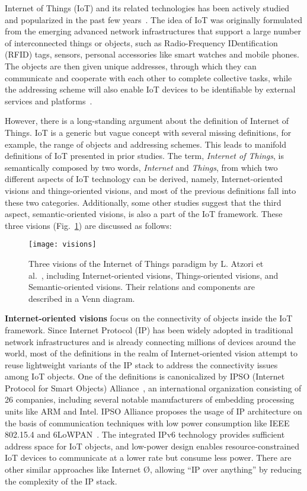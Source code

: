  Internet of Things (IoT) and its related technologies has been actively studied and popularized in the past few years~\cite{DBLP:journals/jnca/AlabaOHA17}. The idea of IoT was originally formulated from the emerging advanced network infrastructures that support a large number of interconnected things or objects, such as Radio-Frequency IDentification (RFID) tags, sensors, personal accessories like smart watches and mobile phones. The objects are then given unique addresses, through which they can communicate and cooperate with each other to complete collective tasks, while the addressing scheme will also enable IoT devices to be identifiable by external services and platforms~\cite{giusto2010internet}\cite{tan2010future}.

However, there is a long-standing argument about the definition of  Internet of Things. IoT is a generic but vague concept with several missing definitions, for example, the range of objects and addressing schemes. This leads to manifold definitions of IoT presented in prior studies. The term, \textit{Internet of Things}, is semantically composed by two words, \textit{Internet} and \textit{Things}, from which two different aspects of IoT technology can be derived, namely, Internet-oriented visions and things-oriented visions, and most of the previous definitions fall into these two categories. Additionally, some other studies suggest that the third aspect, semantic-oriented visions, is also a part of the IoT framework. These three visions (Fig.~\ref{fig:visions}) are discussed as follows:

\begin{figure}[htbp]
	\centering
  	\texttt{[image: visions]}
  	\caption{Three visions of the Internet of Things paradigm by L. Atzori et al.~\cite{DBLP:journals/jnca/AlabaOHA17}, including Internet-oriented visions, Things-oriented visions, and Semantic-oriented visions. Their relations and components are  described in a Venn diagram.}
  	\label{fig:visions}
\end{figure}

\textbf{Internet-oriented visions} focus on the connectivity of objects inside the IoT framework. Since Internet Protocol (IP) has been widely adopted in traditional network infrastructures and is already connecting millions of devices around the world, most of the definitions in the realm of Internet-oriented vision attempt to reuse lightweight variants of the IP stack to address the connectivity issues among IoT objects. One of the definitions is canonicalized by IPSO (Internet Protocol for Smart Objects) Alliance~\cite{vasseur2008ip}, an international organization consisting of 26 companies, including several notable manufacturers of embedding processing units like ARM and Intel. IPSO Alliance proposes the usage of IP architecture on the basis of communication techniques with low power consumption like IEEE 802.15.4 and 6LoWPAN~\cite{culler20096lowpan}. The integrated IPv6 technology  provides sufficient address space for IoT objects, and low-power design enables resource-constrained IoT devices to communicate at a lower rate but consume less power. There are other similar approaches like Internet {\O}, allowing ``IP over anything'' by reducing the complexity of the IP stack.

